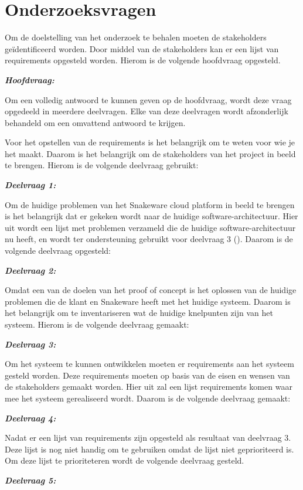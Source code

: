 \section{Onderzoeksvragen}
Om de doelstelling van het onderzoek te behalen moeten de stakeholders geïdentificeerd worden.
Door middel van de stakeholders kan er een lijst van requirements opgesteld worden.
Hierom is de volgende hoofdvraag opgesteld.

\whitespace
\textit{\textbf{Hoofdvraag:} \MainQuestion}

\whitespace
Om een volledig antwoord te kunnen geven op de hoofdvraag, wordt deze vraag opgedeeld in meerdere deelvragen.
Elke van deze deelvragen wordt afzonderlijk behandeld om een omvattend antwoord te krijgen.

\whitespace
Voor het opstellen van de requirements is het belangrijk om te weten voor wie je het maakt.
Daarom is het belangrijk om de stakeholders van het project in beeld te brengen. 
Hierom is de volgende deelvraag gebruikt:

\whitespace
\textit{\textbf{Deelvraag 1:} \SubquestionOne}

\whitespace
Om de huidige problemen van het Snakeware cloud platform in beeld te brengen is het belangrijk dat er gekeken wordt naar de huidige software-architectuur.
Hier uit wordt een lijst met problemen verzameld die de huidige software-architectuur nu heeft, en wordt ter ondersteuning gebruikt voor deelvraag 3 (\textit{\SubquestionThree}).
Daarom is de volgende deelvraag opgesteld:

\whitespace
\textit{\textbf{Deelvraag 2:} \SubquestionTwo}

\whitespace
Omdat een van de doelen van het  proof of concept is het oplossen van de huidige problemen die de klant en Snakeware heeft met het huidige systeem.
Daarom is het belangrijk om te inventariseren wat de huidige knelpunten zijn van het systeem. 
Hierom is de volgende deelvraag gemaakt:

\whitespace
\textit{\textbf{Deelvraag 3:} \SubquestionThree}

\whitespace
Om het systeem te kunnen ontwikkelen moeten er requirements aan het systeem gesteld worden.
Deze requirements moeten op basis van de eisen en wensen van de stakeholders gemaakt worden.
Hier uit zal een lijst requirements komen waar mee het systeem gerealiseerd wordt.
Daarom is de volgende deelvraag gemaakt:

\whitespace
\textit{\textbf{Deelvraag 4:} \SubquestionFour}

\whitespace
Nadat er een lijst van requirements zijn opgesteld als resultaat van deelvraag 3.
Deze lijst is nog niet handig om te gebruiken omdat de lijst niet geprioriteerd is.
Om deze lijst te prioriteteren wordt de volgende deelvraag gesteld.

\whitespace
\textit{\textbf{Deelvraag 5:} \SubquestionFive} \\
